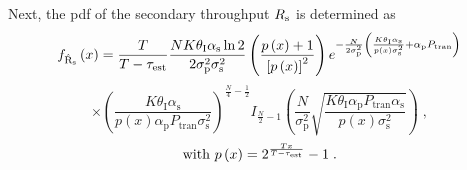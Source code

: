 Next, the pdf of the secondary throughput $R_{\text{s}}$ is determined as
\begin{equation}
	\label{Rspdf}
	f_{\hat{\text{{R}}}_{\text{s}}} \left(x\right) =
	\frac{T}{T-\tau_{\text{est}}}\frac{N K \theta_\textrm{I} \alpha_\textrm{s} \ln{2}}{2 \sigma_\textrm{p}^2 \sigma_\textrm{s}^2} 
	\left(\frac{p\left(x\right)+1}{\left[p\left(x\right)\right]^2} \right)
	e^{-\frac{N}{2 \sigma_\textrm{p}^2} \left(\frac{K \theta_\textrm{I} \alpha_\textrm{s}}{p\left(x\right)\sigma_\textrm{s}^2} + \alpha_\textrm{p} P_\textrm{tran} \right)}
\end{equation}
\begin{equation*}
	\times \left(\frac{K \theta_\textrm{I} \alpha_\textrm{s}}{p\left(x\right) \alpha_\textrm{p} P_\textrm{tran}\sigma_\textrm{s}^2}\right)^{\frac{N}{4}-\frac{1}{2}}
	I_{\frac{N}{2}-1}\left(\frac{N}{\sigma_\textrm{p}^2}\sqrt{\frac{K \theta_\textrm{I} \alpha_\textrm{p} P_\textrm{tran} \alpha_\textrm{s}}{p\left(x\right) \sigma_\textrm{s}^2}}\right) \;  ,
\end{equation*}
\begin{equation*}
\text{with } p\left(x\right) = 2^\frac{Tx}{T-\tau_{\text{est}}}-1 \;  .
\end{equation*} 




